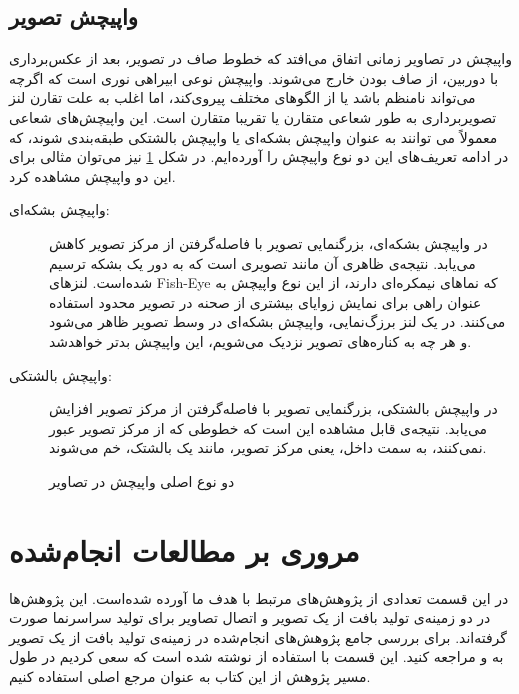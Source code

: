 \subsection{واپیچش تصویر}
واپیچش در تصاویر زمانی اتفاق می‌افتد که خطوط صاف در تصویر، بعد از عکس‌برداری با دوربین، از صاف بودن خارج می‌شوند. واپیچش نوعی ابیراهی نوری است که اگرچه می‌تواند نامنظم باشد یا از الگوهای مختلف پیروی‌کند، اما اغلب به علت تقارن لنز تصویربرداری به طور شعاعی متقارن یا تقریبا متقارن است. این واپیچش‌های شعاعی معمولاً می توانند به عنوان واپیچش بشکه‌ای یا واپیچش بالشتکی طبقه‌بندی شوند، که در ادامه تعریف‌های این دو نوع واپیچش را آورده‌ایم. در شکل \ref{distortions} نیز می‌توان مثالی برای این دو واپیچش مشاهده کرد.
\begin{description}
	\item[واپیچش بشکه‌ای:]
در واپیچش بشکه‌ای، بزرگنمایی تصویر با فاصله‌گرفتن از مرکز تصویر کاهش می‌یابد. نتیجه‌ی ظاهری آن مانند تصویری است که به دور یک بشکه ترسیم شده‌است. لنزهای \gls{Fish-Eye} که نماهای نیمکره‌ای دارند، از این نوع واپیچش به عنوان راهی برای نمایش زوایای بیشتری از صحنه در تصویر محدود استفاده می‌کنند. در یک لنز برزگ‌نمایی، واپیچش بشکه‌ای در وسط تصویر ظاهر می‌شود و هر چه به کناره‌های تصویر نزدیک می‌شویم، این واپیچش بدتر خواهد‌شد.
	\item[واپیچش بالشتکی:]
در واپیچش بالشتکی، بزرگنمایی تصویر با فاصله‌گرفتن از مرکز تصویر افزایش می‌یابد. نتیجه‌ی قابل مشاهده این است که خطوطی که از مرکز تصویر عبور نمی‌کنند، به سمت داخل، یعنی مرکز تصویر، مانند یک بالشتک، خم می‌شوند.
\end{description}
\begin{figure}[h]
	\centering
	\qquad
	\qquad
	\caption{دو نوع اصلی واپیچش در تصاویر}
	\label{distortions}
\end{figure}
\section{مروری بر مطالعات انجام‌شده}
در این قسمت تعدادی از پژوهش‌های مرتبط با هدف ما آورده شده‌است. این پژوهش‌ها در دو زمینه‌ی تولید بافت از یک تصویر و اتصال تصاویر برای تولید سراسرنما صورت گرفته‌اند. برای بررسی جامع پژوهش‌های انجام‌شده در زمینه‌ی تولید بافت از یک تصویر به \cite{jetchev2017texture} و \cite{survey2020} مراجعه کنید. این قسمت با استفاده از \cite{szeliski2011computer} نوشته شده است که سعی کردیم در طول مسیر پژوهش از این کتاب به عنوان مرجع اصلی استفاده کنیم.
